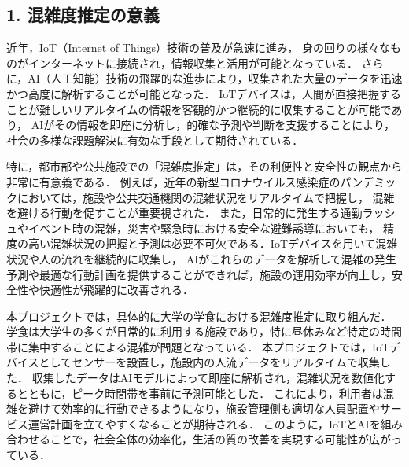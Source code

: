 \subsection*{1. 混雑度推定の意義}
近年，IoT（Internet of Things）技術の普及が急速に進み，
身の回りの様々なものがインターネットに接続され，情報収集と活用が可能となっている．
さらに，AI（人工知能）技術の飛躍的な進歩により，収集された大量のデータを迅速かつ高度に解析することが可能となった．
IoTデバイスは，人間が直接把握することが難しいリアルタイムの情報を客観的かつ継続的に収集することが可能であり，
AIがその情報を即座に分析し，的確な予測や判断を支援することにより，社会の多様な課題解決に有効な手段として期待されている．

特に，都市部や公共施設での「混雑度推定」は，その利便性と安全性の観点から非常に有意義である．
例えば，近年の新型コロナウイルス感染症のパンデミックにおいては，施設や公共交通機関の混雑状況をリアルタイムで把握し，
混雑を避ける行動を促すことが重要視された．
また，日常的に発生する通勤ラッシュやイベント時の混雑，災害や緊急時における安全な避難誘導においても，
精度の高い混雑状況の把握と予測は必要不可欠である．IoTデバイスを用いて混雑状況や人の流れを継続的に収集し，
AIがこれらのデータを解析して混雑の発生予測や最適な行動計画を提供することができれば，施設の運用効率が向上し，安全性や快適性が飛躍的に改善される．

本プロジェクトでは，具体的に大学の学食における混雑度推定に取り組んだ．
学食は大学生の多くが日常的に利用する施設であり，特に昼休みなど特定の時間帯に集中することによる混雑が問題となっている．
本プロジェクトでは，IoTデバイスとしてセンサーを設置し，施設内の人流データをリアルタイムで収集した．
収集したデータはAIモデルによって即座に解析され，混雑状況を数値化するとともに，ピーク時間帯を事前に予測可能とした．
これにより，利用者は混雑を避けて効率的に行動できるようになり，施設管理側も適切な人員配置やサービス運営計画を立てやすくなることが期待される．
このように，IoTとAIを組み合わせることで，社会全体の効率化，生活の質の改善を実現する可能性が広がっている．
%

